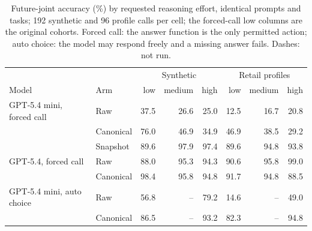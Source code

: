 \begin{table}[t]
\centering\footnotesize
\begin{tabular}{llrrrrrr}
\toprule
 & & \multicolumn{3}{c}{Synthetic} & \multicolumn{3}{c}{Retail profiles} \\
Model & Arm & low & medium & high & low & medium & high \\
\midrule
GPT-5.4 mini, forced call & Raw & 37.5 & 26.6 & 25.0 & 12.5 & 16.7 & 20.8 \\
 & Canonical & 76.0 & 46.9 & 34.9 & 46.9 & 38.5 & 29.2 \\
 & Snapshot & 89.6 & 97.9 & 97.4 & 89.6 & 94.8 & 93.8 \\
\midrule
GPT-5.4, forced call & Raw & 88.0 & 95.3 & 94.3 & 90.6 & 95.8 & 99.0 \\
 & Canonical & 98.4 & 95.8 & 94.8 & 91.7 & 94.8 & 88.5 \\
\midrule
GPT-5.4 mini, auto choice & Raw & 56.8 & -- & 79.2 & 14.6 & -- & 49.0 \\
 & Canonical & 86.5 & -- & 93.2 & 82.3 & -- & 94.8 \\
\bottomrule
\end{tabular}
\caption{Future-joint accuracy (\%) by requested reasoning effort, identical prompts and tasks; 192 synthetic and 96 profile calls per cell; the forced-call low columns are the original cohorts. Forced call: the answer function is the only permitted action; auto choice: the model may respond freely and a missing answer fails. Dashes: not run.}
\label{tab:effort}
\end{table}
